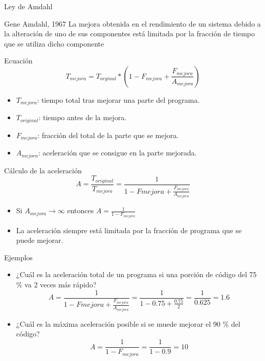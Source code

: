\documentclass[utf8]{beamer}
\begin{document}
\begin{frame}[allowframebreaks]{Ley de Amdahl}
    \begin{block}{Gene Amdahl, 1967}
        La mejora obtenida en el rendimiento de un sistema debido a la alteración de uno de sus componentes está limitada por la fracción de tiempo que se utiliza dicho componente
    \end{block}
    \begin{block}{Ecuación}
        $$ T_{mejora} = T_{orginal} * (1 - F_{mejora} + \frac{F_{mejora}}{A_{mejora}}) $$
        \begin{itemize}
            \item $T_{mejora}$: tiempo total tras mejorar una parte del programa.
            \item $T_{original}$: tiempo antes de la mejora.
            \item $F_{mejora}$: fracción del total de la parte que se mejora.
            \item $A_{mejora}$: aceleración que se consigue en la parte mejorada.
        \end{itemize}
    \end{block}
    \begin{block}{Cálculo de la aceleración}
        $$ A = \frac{T_{original}}{T_{mejora}} = \frac{1}{1-F{mejora}+\frac{F_{mejora}}{A_{mejora}}} $$
        \begin{itemize}
        \item Si $A_{mejora} \rightarrow \infty$ entonces $A = \frac{1}{1 - F_{mejora}}$ \\
        \item La aceleración siempre está limitada por la fracción de programa que se puede mejorar.
        \end{itemize}
    \end{block}
    \begin{block}{Ejemplos}
        \begin{itemize}
        \item ¿Cuál es la aceleración total de un programa si una porción de código del 75 \% va 2 veces más rápido?
        $$ A = \frac{1}{1-F{mejora}+\frac{F_{mejora}}{A_{mejora}}} = \frac{1}{1 - 0.75 + \frac{0.75}{2}} = \frac{1}{0.625} = 1.6 $$
        \item ¿Cuál es la máxima aceleración posible si se muede mejorar el 90 \% del código?
        $$ A = \frac{1}{1 - F_{mejora}} = \frac{1}{1 - 0.9} = 10 $$
        \end{itemize}
    \end{block}

\end{frame}
\end{document}
